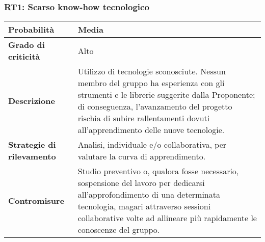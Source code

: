 \subsubsection{RT1: Scarso know-how tecnologico}

\bgroup
\begin{adjustwidth}{-0.5cm}{-0.5cm}
 	\begin{longtable}{P{4.5cm}|>{\justifying \arraybackslash}P{9cm}}

		\textbf{Probabilità} & Media \\
        \hline
        \textbf{Grado di criticità} & Alto \\
        \hline
        \textbf{Descrizione} & Utilizzo di tecnologie sconosciute. Nessun membro del gruppo ha
        esperienza con gli strumenti e le librerie suggerite dalla Proponente; di conseguenza, l’avanzamento del progetto rischia di subire rallentamenti dovuti all’apprendimento delle nuove tecnologie. \\
        \hline
        \textbf{Strategie di rilevamento} &  Analisi, individuale e/o collaborativa, per valutare la
        curva di apprendimento. \\
        \hline
        \textbf{Contromisure} & Studio preventivo o, qualora fosse necessario, sospensione del
        lavoro per dedicarsi all’approfondimento di una determinata tecnologia, magari attraverso sessioni collaborative volte ad allineare più rapidamente le conoscenze del gruppo.  
	\end{longtable}
\end{adjustwidth}
\egroup